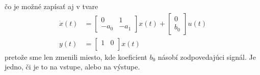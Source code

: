 \documentclass[a4paper, 10pt, ]{article}
\begin{document}
čo je možné zapísať aj v tvare
\begin{subequations}
    \begin{align}
        \dot x(t)
        &=
        \begin{bmatrix}
            0 & 1 \\
            - a_0 & - a_1
          \end{bmatrix}
        x(t)
        +
        \begin{bmatrix}
              0 \\
              b_0
         \end{bmatrix}
        u(t)
        \\
        y(t)
        &=
        \begin{bmatrix}
            1 & 0 \\
        \end{bmatrix}
        x(t)
\end{align}
\end{subequations}
pretože sme len zmenili miesto, kde koeficient $b_0$ násobí zodpovedajúci signál. Je jedno, či je to na vstupe, alebo na výstupe. 
\end{document}
